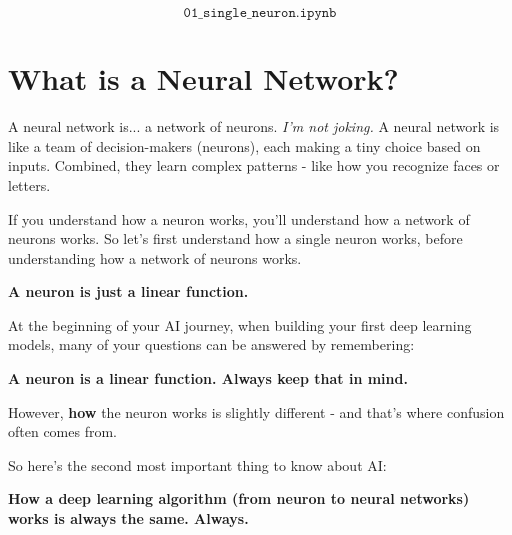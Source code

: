 \documentclass[11pt]{article}
\begin{document}
\label{sec:theory_00}

\[
\texttt{01\_single\_neuron.ipynb}
\]

\section*{What is a Neural Network?}

A neural network is... a network of neurons. \textit{I'm not joking.}  
A neural network is like a team of decision-makers (neurons), each making a tiny choice based on inputs. Combined, they learn complex patterns - like how you recognize faces or letters.

\vspace{0.5em}

If you understand how a neuron works, you'll understand how a network of neurons works.  
So let's first understand how a single neuron works, before understanding how a network of neurons works.

\vspace{1em}

\begin{tcolorbox}[colback=gray!10, colframe=gray!50!black, sharp corners=southwest, boxrule=0.3mm, title style={draw=none, fill=none}, title=]
\centering
\textbf{A neuron is just a linear function.}
\end{tcolorbox}

\vspace{1em}

At the beginning of your AI journey, when building your first deep learning models, many of your questions can be answered by remembering:

\begin{tcolorbox}[colback=gray!10, colframe=gray!50!black, sharp corners=southwest, boxrule=0.3mm, title style={draw=none, fill=none}, title=]
\centering
\textbf{A neuron is a linear function. Always keep that in mind.}
\end{tcolorbox}

\vspace{1em}

However, \textbf{how} the neuron works is slightly different - and that's where confusion often comes from.

\vspace{0.5em}

So here's the second most important thing to know about AI:

\begin{tcolorbox}[colback=gray!10, colframe=gray!50!black, sharp corners=southwest, boxrule=0.3mm, title style={draw=none, fill=none}, title=]
\centering
\textbf{How a deep learning algorithm (from neuron to neural networks) works is always the same. Always.}
\end{tcolorbox}
\end{document}
